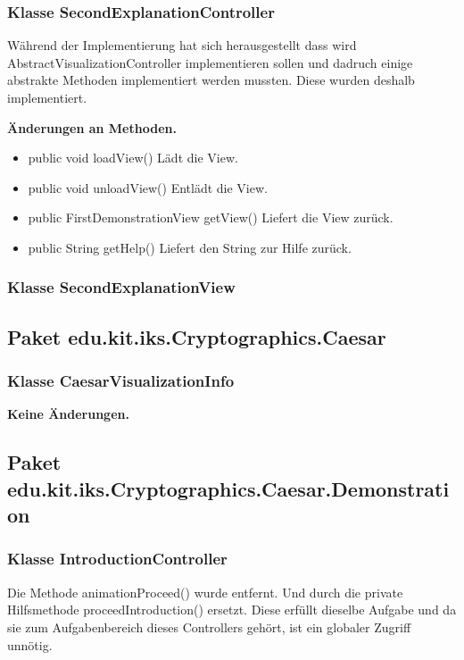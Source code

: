 \documentclass{article}
\begin{document}
    \subsubsection{Klasse SecondExplanationController}
	Während der Implementierung hat sich herausgestellt dass wird AbstractVisualizationController implementieren sollen und dadruch 
	einige abstrakte Methoden implementiert werden mussten. Diese wurden deshalb implementiert.\newline
           
    \textbf{Änderungen an Methoden.}
      \begin{itemize}
		\item public void loadView()\newline
              Lädt die View.
        \item public void unloadView()\newline
              Entlädt die View.
        \item public FirstDemonstrationView getView()\newline
              Liefert die View zurück.
        \item public String getHelp()\newline
              Liefert den String zur Hilfe zurück.
      \end{itemize}
	  
    \subsubsection{Klasse SecondExplanationView}

  \subsection{Paket edu.kit.iks.Cryptographics.Caesar}
  
  	\subsubsection{Klasse CaesarVisualizationInfo}
  	 \textbf{Keine Änderungen.}

 	\subsection{Paket edu.kit.iks.Cryptographics.Caesar.Demonstration}
          
          \subsubsection{Klasse IntroductionController}
            Die Methode animationProceed() wurde entfernt. Und durch die private Hilfsmethode proceedIntroduction() ersetzt.
            Diese erfüllt dieselbe Aufgabe und da sie zum Aufgabenbereich dieses Controllers gehört, ist ein globaler Zugriff
            unnötig.
\end{document}
